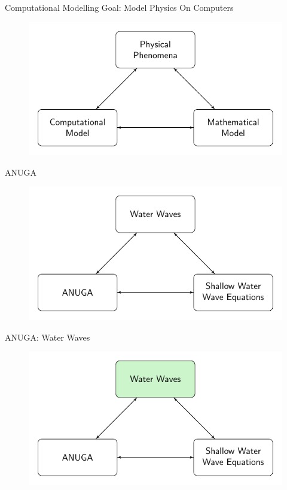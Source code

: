 \documentclass[handout]{beamer}
\begin{document}
\begin{frame}{Computational Modelling}
	Goal: Model Physics On Computers \pause
	\begin{figure}
		\includegraphics[width=\textwidth]{./Pics/ModelDiagrams/FlowChart.pdf}
	\end{figure}
\end{frame}

\begin{frame}{ANUGA}
	\begin{figure}
		\includegraphics[width=\textwidth]{./Pics/ModelDiagrams/FlowChartANUGA.pdf}
	\end{figure}
\end{frame}

\begin{frame}{ANUGA: Water Waves}
	\begin{figure}
		\includegraphics[width=\textwidth]{./Pics/ModelDiagrams/FlowChartANUGA1G.pdf}
	\end{figure}
\end{frame}
\end{document}
